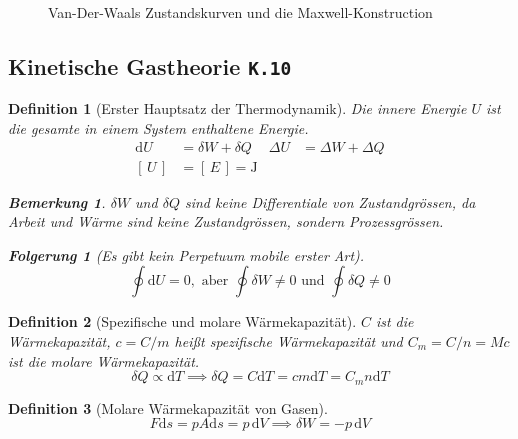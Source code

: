 \documentclass[a4paper, twocolumn]{article}
\numberwithin{equation}{section}
\theoremstyle{hsr-def}
\newtheorem{definition}{Definition}[section]
\theoremstyle{hsr-sub}
\newtheorem{result}{Folgerung}[definition]
\newtheorem{remark}{Bemerkung}[definition]
\newcommand{\dd}[1]{\ensuremath{\mathrm{d}#1}}
\newcommand{\di}[1]{\,\dd{#1}}
\newcommand{\unitof}[1]{\ensuremath{\left[\,#1\,\right]}}
\newcommand{\fromlecture}[1]{\textcolor{red!70!black}{\small\texttt{K.#1}}}
\begin{document}
\begin{figure}[h] \centering
    
    \caption{Van-Der-Waals Zustandskurven und die Maxwell-Konstruction}
    \label{fig:maxwell-isotherm}
\end{figure}

\subsection{Kinetische Gastheorie \fromlecture{10}}
\begin{definition}[Erster Hauptsatz der Thermodynamik]
Die innere Energie \(U\) ist die gesamte in einem System enthaltene Energie.
\begin{align*}
    \dd{U} &= \delta W + \delta Q &
    \Delta U &= \Delta W + \Delta Q \\
    \unitof{U} &= \unitof{E} = \si{\joule}
\end{align*}
\begin{remark}
\(\delta W\) und \(\delta Q\) sind keine Differentiale von Zustandgr\"ossen, da Arbeit und W\"arme sind keine Zustandgr\"ossen, sondern Prozessgr\"ossen.
\end{remark}
\begin{result}[Es gibt kein Perpetuum mobile erster Art]
\[
    \oint \dd{U} = 0, \text{ aber } \oint \delta W \neq 0 \text{ und } \oint \delta Q \neq 0
\]
\end{result}
\end{definition}

\begin{definition}[Spezifische und molare W\"armekapazit\"at]
\(C\) ist die W\"armekapazit\"at, \(c = C/m\) hei{\ss}t \emph{spezifische} W\"armekapazit\"at und \(C_m = C/n = Mc\) ist die \emph{molare} W\"armekapazit\"at.
\[
    \delta Q \propto \dd{T} \implies \delta Q = C\dd{T} = cm\dd{T} = C_m n\dd{T}
\]
\end{definition}

\begin{definition}[Molare W\"armekapazit\"at von Gasen]
\[
    F\dd{s} = pA\dd{s} = p\di{V} \implies \delta W = -p\di{V}
\]
\end{definition}
\end{document}
